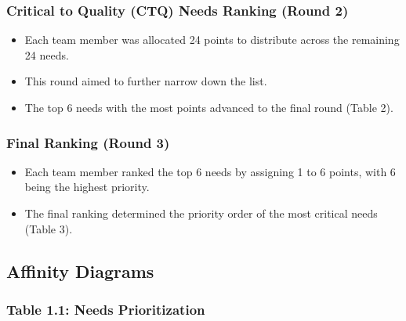 \documentclass[12pt]{report}
\begin{document}
\subsubsection{Critical to Quality (CTQ) Needs Ranking (Round 2)}
\begin{itemize}
    \item Each team member was allocated 24 points to distribute across the remaining 24 needs.
    \item This round aimed to further narrow down the list.
    \item The top 6 needs with the most points advanced to the final round (Table 2).
\end{itemize}

\subsubsection{Final Ranking (Round 3)}
\begin{itemize}
    \item Each team member ranked the top 6 needs by assigning 1 to 6 points, with 6 being the highest priority.
    \item The final ranking determined the priority order of the most critical needs (Table 3).
\end{itemize}




\subsection{Affinity Diagrams}

\subsubsection{Table 1.1: Needs Prioritization}
\end{document}
